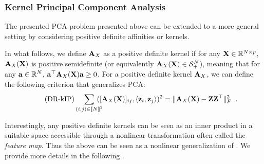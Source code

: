 \subsubsection{Kernel Principal Component Analysis}

The presented PCA problem presented above can be extended to a more general setting by considering positive definite affinities or kernels. 

In what follows, we define ${\mathbf{A}}_{X}$ as a positive definite kernel if for any ${\mathbf{X}} \in \mathbb{R}^{N \times p}$, ${\mathbf{A}}_{X}({\mathbf{X}})$ is positive semidefinite (or equivalently ${\mathbf{A}}_{X}({\mathbf{X}}) \in \mathcal{S}^N_{+}$), meaning that for any ${\mathbf{a}} \in \mathbb{R}^N$, ${\mathbf{a}}^\top {\mathbf{A}}_{X}({\mathbf{X}}) {\mathbf{a}} \geq 0$. For a positive definite kernel ${\mathbf{A}}_{X}$, we can define the following criterion that generalizes PCA:
\begin{align}\label{eq:DR_kIP}\tag{DR-kIP}
	\sum_{(i,j) \in {[\![N]\!]}^2} \!\!\!\!\! ([{\mathbf{A}}_{X}({\mathbf{X}})]_{ij}, \langle {\mathbf{z}}_i, {\mathbf{z}}_j \rangle)^2 = \| {\mathbf{A}}_{X}({\mathbf{X}}) - {\mathbf{Z}}{\mathbf{Z}}^\top \|^2_F\ \:.
\end{align}

Interestingly, any positive definite kernels can be seen as an inner product in a suitable space accessible through a nonlinear transformation often called the \emph{feature map}. Thus the above  can be seen as a nonlinear generalization of . We provide more details in the following .

